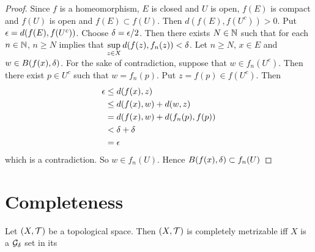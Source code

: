 \documentclass{book}
\begin{document}
\begin{proof}
	Since $f$ is a homeomorphism, $E$ is closed and $U$ is open, $f(E)$ is compact and $f(U)$ is open and $f(E) \subset f(U)$. Then $d(f(E), f(U^c)) >0$. Put $\epsilon = d(f(E), f(U^c))$. Choose $\delta = \epsilon/2$. Then there exists $N \in \mathbb{N}$ such that for each $n \in \mathbb{N}$, $n \geq N$ implies that $\sup\limits_{z \in X} d(f(z), f_n(z)) < \delta$. Let $n \geq N$, $x \in E$ and $w \in B(f(x), \delta)$. For the sake of contradiction, suppose that $w \in f_n(U^c)$. Then there exist $p \in U^c$ such that $w = f_n(p)$. Put $z = f(p) \in f(U^c)$. Then 
	\begin{align*}
		\epsilon 
		&\leq d(f(x), z) \\ 
		&\leq d(f(x), w) + d(w, z) \\
		& = d(f(x), w) + d(f_n(p), f(p))  \\
		& < \delta + \delta \\
		& = \epsilon
	\end{align*}
	which is a contradiction. So $w \in f_n(U)$. Hence $B(f(x), \delta) \subset f_n(U)$
\end{proof}








































\newpage
\section{Completeness}

\begin{ex}
	Let $(X, \mathcal{T})$ be a topological space. Then $(X, \mathcal{T})$ is completely metrizable iff $X$ is a $\mathcal{G}_{\delta}$ set in its 
\end{ex}
\end{document}
